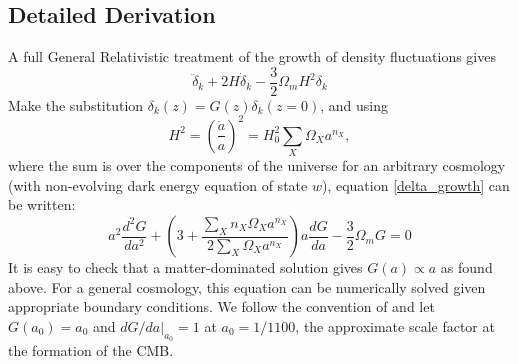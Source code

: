 \documentclass[12pt,preprint]{aastex}			%
\begin{document}
\subsection{Detailed Derivation}
A full General Relativistic treatment of the growth of density fluctuations 
gives \citep[see, e.g.][]{Peacock}
\begin{equation}
  \label{delta_growth}
  \ddot{\delta}_k + 2H\dot{\delta}_k - \frac{3}{2}\Omega_m H^2 \delta_k
\end{equation}
Make the substitution $\delta_k(z) = G(z)\delta_k(z=0)$, and using
\begin{equation} 
  H^2 = \left( \frac{\dot{a}}{a}\right)^2 = H_0^2 \sum_X \Omega_X a^{n_X},
\end{equation}
where the sum is over the components of the universe for an arbitrary
cosmology (with non-evolving dark energy equation of state $w$), 
equation \ref{delta_growth} can 
be written:
\begin{equation}
  a^2 \frac{d^2G}{da^2} + \left(3+\frac{\sum_X n_X \Omega_X a^{n_X}}
  {2\sum_X \Omega_X a^{n_X}} \right)a\frac{dG}{da} - \frac{3}{2}\Omega_m G = 0
\end{equation}
It is easy to check that a matter-dominated solution gives $G(a) \propto a$
as found above.  For a general cosmology, this equation can be numerically 
solved given appropriate boundary conditions.  We follow the convention of
\citet{Takada04} and let $G(a_0)=a_0$ and $dG/da|_{a_0} = 1$ at $a_0=1/1100$, the approximate
scale factor at the formation of the CMB.
\end{document}
